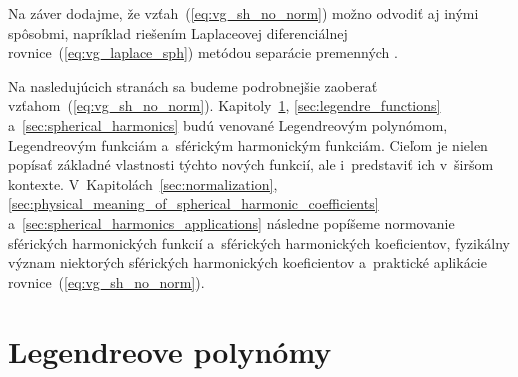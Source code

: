 \documentclass[a4paper, 12pt]{book}
\begin{document}
Na záver dodajme, že vzťah~(\ref{eq:vg_sh_no_norm}) možno odvodiť aj inými 
spôsobmi, napríklad riešením Laplaceovej diferenciálnej 
rovnice~(\ref{eq:vg_laplace_sph}) metódou separácie premenných 
\parencite{MoritzPhysicalGeodesy,Janak2006}.

Na nasledujúcich stranách sa budeme podrobnejšie zaoberať 
vzťahom~(\ref{eq:vg_sh_no_norm}).  Kapitoly~\ref{sec:legendre_polynomials}, 
\ref{sec:legendre_functions} a~\ref{sec:spherical_harmonics} budú venované 
Legendreovým polynómom, Legendreovým funkciám a~sférickým harmonickým funkciám.  
Cieľom je nielen popísať základné vlastnosti týchto nových funkcií, ale 
i~predstaviť ich v~širšom kontexte.  V~Kapitolách~\ref{sec:normalization}, 
\ref{sec:physical_meaning_of_spherical_harmonic_coefficients} 
a~\ref{sec:spherical_harmonics_applications} následne popíšeme normovanie 
sférických harmonických funkcií a~sférických harmonických koeficientov, 
fyzikálny význam niektorých sférických harmonických koeficientov a~praktické 
aplikácie rovnice~(\ref{eq:vg_sh_no_norm}).






\section{Legendreove polynómy}
\label{sec:legendre_polynomials}
\end{document}
